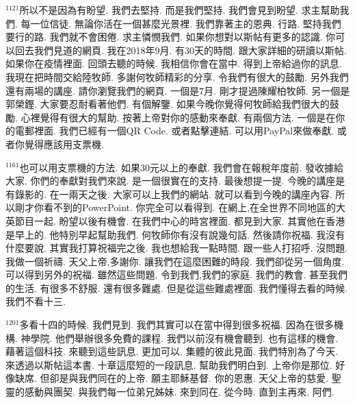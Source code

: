 \documentclass{book}
\begin{document}
$^{1121}$所以不是因為有盼望.
我們去堅持.
而是我們堅持.
我們會見到盼望.
求主幫助我們.
每一位信徒.
無論你活在一個甚麼光景裡.
我們靠著主的恩典.
行路.
堅持我們要行的路.
我們就不會困倦.
求主憐憫我們.
如果你想對以斯帖有更多的認識.
你可以回去我們見道的網頁.
我在2018年9月.
有30天的時間.
跟大家詳細的研讀以斯帖.
如果你在疫情裡面.
回頭去聽的時候.
我相信你會在當中.
得到上帝給過你的訊息.
我現在把時間交給陸牧師.
多謝何牧師精彩的分享.
令我們有很大的鼓勵.
另外我們還有兩場的講座.
請你瀏覽我們的網頁.
一個是7月.
剛才提過陳耀柏牧師.
另一個是郭榮鏗.
大家要忍耐看著他們.
有個解鑒.
如果今晚你覺得何牧師給我們很大的鼓勵.
心裡覺得有很大的幫助.
按著上帝對你的感動來奉獻.
有兩個方法.
一個是在你的電郵裡面.
我們已經有一個QR Code.
或者點擊連結.
可以用PayPal來做奉獻.
或者你覺得應該用支票機.

$^{1161}$也可以用支票機的方法.
如果30元以上的奉獻.
我們會在報稅年度前.
發收據給大家.
你們的奉獻對我們來說.
是一個很實在的支持.
最後想提一提.
今晚的講座是有錄影的.
在一兩天之後.
大家可以上我們的網站.
就可以看到今晚的講座內容.
所以剛才你看不到的PowerPoint.
你完全可以看得到.
在網上,在全世界不同地區的大英節目一起.
盼望以後有機會.
在我們中心的時宮裡面.
都見到大家.
其實他在香港是早上的.
他特別早起幫助我們.
何牧師你有沒有說幾句話.
然後請你祝福.
我沒有什麼要說.
其實我打算祝福完之後.
我也想給我一點時間.
跟一些人打招呼.
沒問題.
我做一個祈禱.
天父上帝,多謝你.
讓我們在這麼困難的時段.
我們卻從另一個角度.
可以得到另外的祝福.
雖然這些問題.
令到我們,我們的家庭.
我們的教會.
甚至我們的生活.
有很多不舒服.
還有很多難處.
但是從這些難處裡面.
我們懂得去看的時候.
我們不看十三.

$^{1201}$多看十四的時候.
我們見到.
我們其實可以在當中得到很多祝福.
因為在很多機構.
神學院.
他們舉辦很多免費的課程.
我們以前沒有機會聽到.
也有這樣的機會.
藉著這個科技.
來聽到這些訊息.
更加可以.
集體的彼此見面.
我們特別為了今天.
來透過以斯帖這本書.
十章這麼短的一段訊息.
幫助我們明白到.
上帝你是那位.
好像缺席.
但卻是與我們同在的上帝.
願主耶穌基督.
你的恩惠.
天父上帝的慈愛.
聖靈的感動與團契.
與我們每一位弟兄姊妹.
來到同在.
從今時.
直到主再來.
阿們.
\newpage
\end{document}
